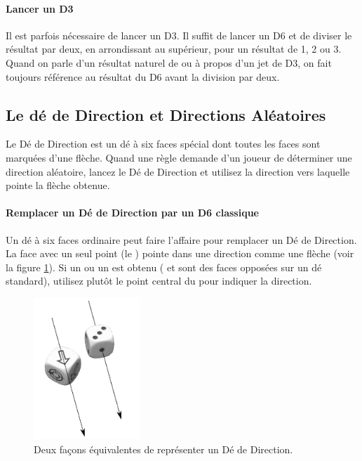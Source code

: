 \paragraph{Lancer un D3}

Il est parfois nécessaire de lancer un D3. Il suffit de lancer un D6 et de diviser le résultat par deux, en arrondissant au supérieur, pour un résultat de 1, 2 ou 3. Quand on parle d'un résultat naturel de  ou  à propos d'un jet de D3, on fait toujours référence au résultat du D6 avant la division par deux.

\subsection{Le dé de Direction et Directions Aléatoires}

Le Dé de Direction est un dé à six faces spécial dont toutes les faces sont marquées d'une flèche. Quand une règle demande d'un joueur de déterminer une direction aléatoire, lancez le Dé de Direction et utilisez la direction vers laquelle pointe la flèche obtenue.

\paragraph{Remplacer un Dé de Direction par un D6 classique}

Un dé à six faces ordinaire peut faire l'affaire pour remplacer un Dé de Direction. La face avec un seul point (le ) pointe dans une direction comme une flèche (voir la figure \ref{figure/deviation_dice}). Si un  ou un  est obtenu ( et  sont des faces opposées sur un dé standard), utilisez plutôt le point central du  pour indiquer la direction.

\begin{figure}[!htbp]
\centering
\includegraphics[width=4cm]{pics/deviation_dice.png}
\caption{Deux façons équivalentes de représenter un Dé de Direction.}
\label{figure/deviation_dice}
\end{figure}

